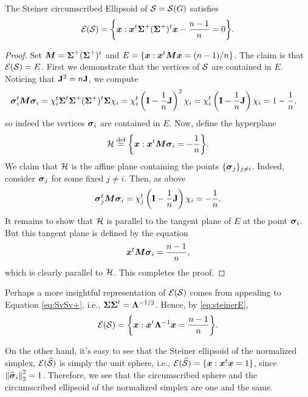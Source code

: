 \begin{lemma}
The Steiner circumscribed Ellipsoid of $\mathcal{S}=\mathcal{S}(G)$ satisfies
\begin{equation}
\label{eq:steinerE}
    \mathcal{E}(\mathcal{S}) = \bigg\{\vb*{x}: \vb*{x}^t \boldsymbol{\Sigma}^+(\boldsymbol{\Sigma}^+)^t \vb*{x} - \frac{n-1}{n}=0\bigg\}.
\end{equation}
\end{lemma}
\begin{proof}
Set ${\vb*{M}}=\boldsymbol{\Sigma}^+(\boldsymbol{\Sigma}^+)^t$ and $E=\{\vb*{x}:\vb*{x}^t {\vb*{M}}\vb*{x}=(n-1)/n\}$. The claim is that $\mathcal{E}(\mathcal{S})=E$.  
First we demonstrate that the vertices of $\mathcal{S}$ are contained in $E$. Noticing that $\vb{J}^2=n\vb{J}$, we compute 
\begin{align*}
    \vb*{\sigma}_i^t {\vb*{M}} \vb*{\sigma}_i &= \chi_i^t \boldsymbol{\Sigma}^t \boldsymbol{\Sigma}^+(\boldsymbol{\Sigma}^+)^t \boldsymbol{\Sigma} \chi_i = \chi_i^t \left(\vb{I}-\frac{1}{n}\vb{J}\right)^2 \chi_i = \chi_i^t \left(\vb{I}-\frac{1}{n}\vb{J}\right) \chi_i = 1 - \frac{1}{n}, 
\end{align*}
so indeed the vertices $\vb*{\sigma}_i$ are contained in $E$. Now, define the hyperplane 
\[\mathcal{H}\overset{\text{def}}{=} \bigg\{\vb*{x}:\vb*{x}^t {\vb*{M}} \vb*{\sigma}_i = -\frac{1}{n}\bigg\}.\]
We claim that $\mathcal{H}$ is the affine plane containing the points $\{\vb*{\sigma}_j\}_{j\neq i}$. Indeed, consider $\vb*{\sigma}_j$ for some fixed $j\neq i$. Then, as above 
\[\vb*{\sigma}_j^t {\vb*{M}}\vb*{\sigma}_i = \chi_j^t \left(\vb{I}-\frac{1}{n}\vb{J}\right) \chi_i = -\frac{1}{n}. \]
It remains to show that $\mathcal{H}$ is parallel to the tangent plane of $E$ at the point $\vb*{\sigma}_i$. But this tangent plane is defined by the equation~\cite{fiedler2005geometry} 
\[\vb*{x}^t {\vb*{M}}\vb*{\sigma}_i =\frac{n-1}{n},\]
which is clearly parallel to $\mathcal{H}$. This completes the proof.
\end{proof}

Perhaps a more insightful representation of $\mathcal{E}(\mathcal{S})$ comes from appealing to Equation \eqref{eq:SvSv+}, i.e., $\boldsymbol{\Sigma}\boldsymbol{\Sigma}^t = \vb{\Lambda}^{-1/2}$. Hence, by \eqref{eq:steinerE},
\begin{equation}
\label{eq:steinerE2}
    \mathcal{E}(\mathcal{S}) = \bigg\{\vb*{x}:\vb*{x}^t \vb{\Lambda}^{-1}\vb*{x} = \frac{n-1}{n}\bigg\}.
\end{equation}

On the other hand, it's easy to see that the Steiner ellipsoid of the normalized simplex, $\mathcal{E}(\widehat{\mathcal{S}})$ is simply the unit sphere, i.e., $\mathcal{E}(\widehat{\mathcal{S}}) = \{\vb*{x}:\vb*{x}^t \vb*{x} = 1\}$, since $\norm{\widehat{\vb*{\sigma}}_i}_2^2=1$. 
Therefore, we see that the circumscribed sphere and the circumscribed ellipsoid of the normalized simplex are one and the same. 

